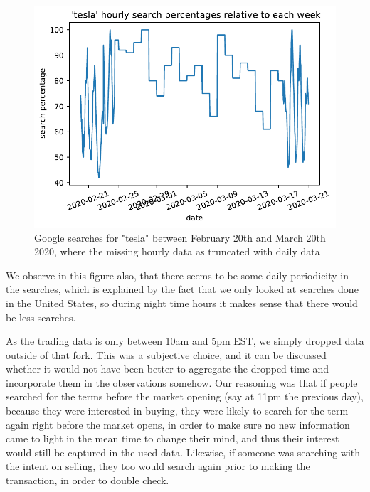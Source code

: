 \begin{figure}[h]
	\centering
	\includegraphics[width=\textwidth]{img/img_GT_tesla_probarea.pdf}
	\caption{Google searches for "tesla" between February 20th and March 20th 2020, where the missing hourly data as truncated with daily data}
	\label{fig:GT_tesla_probarea}
\end{figure}

We observe in this figure also, that there seems to be some daily periodicity in the searches, which is explained by the fact that we only looked at searches done in the United States, so during night time hours it makes sense that there would be less searches.


As the trading data is only between 10am and 5pm EST, we simply dropped data outside of that fork. This was a subjective choice, and it can be discussed whether it would not have been better to aggregate the dropped time and incorporate them in the observations somehow. Our reasoning was that if people searched for the terms before the market opening (say at 11pm the previous day), because they were interested in buying, they were likely to search for the term again right before the market opens, in order to make sure no new information came to light in the mean time to change their mind, and thus their interest would still be captured in the used data. Likewise, if someone was searching with the intent on selling, they too would search again prior to making the transaction, in order to double check.


